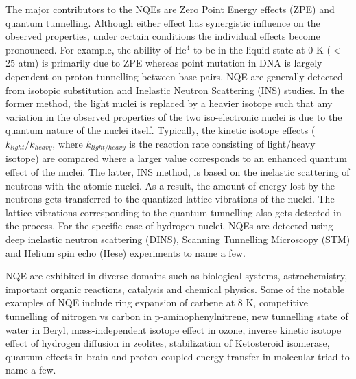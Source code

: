 \noindent The major contributors to the NQEs are Zero Point Energy effects (ZPE) and quantum tunnelling. Although either effect has synergistic influence on the observed properties, under certain conditions the individual effects become pronounced. For example, the ability of He$^4$ to be in the liquid state at 0 K\cite{london1936condensed} ($<$ 25 atm) is primarily due to ZPE whereas point mutation in DNA is largely dependent on proton tunnelling\cite{slocombe2022open,rein1964proton} between base pairs. 
\noindent NQE are generally detected from isotopic substitution and Inelastic Neutron Scattering (INS) studies. In the former method, the light nuclei is replaced by a heavier isotope such that any variation in the observed properties of the two iso-electronic nuclei is due to the quantum nature of the nuclei itself. Typically, the kinetic isotope effects ($k_{light}/k_{heavy}$, where $k_{light/heavy}$ is the reaction rate consisting of light/heavy isotope) are compared where a larger value corresponds to an enhanced quantum effect of the nuclei. The latter, INS method, is based on the inelastic scattering of neutrons with the atomic nuclei. As a result, the amount of energy lost by the neutrons gets transferred to the quantized lattice vibrations of the nuclei. The lattice vibrations corresponding to the quantum tunnelling also gets detected in the process. For the specific case of hydrogen nuclei, NQEs are detected using deep inelastic neutron scattering (DINS), Scanning Tunnelling Microscopy\cite{cahlik2021significance} (STM) and Helium spin echo\cite{jardine2010determination} (Hese) experiments to name a few. 

NQE are exhibited in diverse domains such as biological systems\cite{riaz2013review,kohen1999hydrogen,nagel200921st,pu2006multidimensional}, astrochemistry\cite{hama2013surface,jorgensen2020astrochemistry}, important organic reactions\cite{meisner2016atom,castro2020heavy}, catalysis\cite{klinman2006role,knapp2002environmentally} and chemical physics\cite{leger2019observation,cazorla2017simulation}. Some of the notable examples of NQE include ring expansion of carbene\cite{zuev2003carbon} at 8 K, competitive tunnelling of nitrogen vs carbon in p-aminophenylnitrene\cite{leger2019observation},  new tunnelling state of water in Beryl\cite{kolesnikov2016quantum}, mass-independent isotope effect in ozone\cite{thiemens2001mass,thiemens1999mass}, inverse kinetic isotope effect of hydrogen diffusion in zeolites\cite{gao2019quantum}, stabilization of Ketosteroid isomerase\cite{wang2014quantum}, quantum effects in brain\cite{adams2020quantum} and proton-coupled energy transfer in molecular triad\cite{pettersson2022proton} to name a few. 





